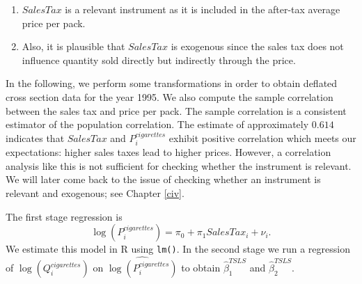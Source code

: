 \documentclass[
  14pt,
]{memoir}
\newenvironment{Shaded}{\begin{snugshade}}{\end{snugshade}}
\newcommand{\CommentTok}[1]{\textcolor[rgb]{0.56,0.35,0.01}{\textit{#1}}}
\newcommand{\FunctionTok}[1]{\textcolor[rgb]{0.00,0.00,0.00}{#1}}
\newcommand{\NormalTok}[1]{#1}
\newcommand{\OtherTok}[1]{\textcolor[rgb]{0.56,0.35,0.01}{#1}}
\newcommand{\SpecialCharTok}[1]{\textcolor[rgb]{0.00,0.00,0.00}{#1}}
\newcommand{\StringTok}[1]{\textcolor[rgb]{0.31,0.60,0.02}{#1}}
\begin{document}
\begin{enumerate}
\item $SalesTax$ is a relevant instrument as it is included in the after-tax average price per pack. 
\item Also, it is plausible that $SalesTax$ is exogenous since the sales tax does not influence quantity sold directly but indirectly through the price.
\end{enumerate}

In the following, we perform some transformations in order to obtain deflated cross section data for the year 1995. We also compute the sample correlation between the sales tax and price per pack. The sample correlation is a consistent estimator of the population correlation. The estimate of approximately \(0.614\) indicates that \(SalesTax\) and \(P_i^{cigarettes}\) exhibit positive correlation which meets our expectations: higher sales taxes lead to higher prices. However, a correlation analysis like this is not sufficient for checking whether the instrument is relevant. We will later come back to the issue of checking whether an instrument is relevant and exogenous; see Chapter \ref{civ}.

\begin{Shaded}
\end{Shaded}

The first stage regression is
\[
\log(P_i^{cigarettes}) = \pi_0 + \pi_1 SalesTax_i + \nu_i.
\]
We estimate this model in \textsf{R} using \texttt{lm()}. In the second stage we run a regression of \(\log(Q_i^{cigarettes})\) on \(\widehat{\log(P_i^{cigarettes})}\) to obtain \(\widehat{\beta}_1^{TSLS}\) and \(\widehat{\beta}_2^{TSLS}\).
\end{document}
